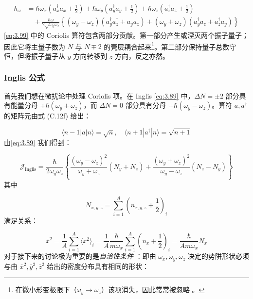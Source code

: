 \begin{align}
h_{\omega} & =\hbar\omega_{x}\left(a^{\dagger}_{x}a_{x}+\frac{1}{2}\right)+\hbar\omega_{y}\left(a^{\dagger}_{y}a_{y}+\frac{1}{2}\right)+\hbar\omega_{z}\left(a^{\dagger}_{z}a_{z}+\frac{1}{2}\right)\nonumber \\
 & \quad+\frac{\hbar\omega}{2\sqrt{\omega_{y}\omega_{z}}}\left\{ (\omega_{y}-\omega_{z})\left(a^{\dagger}_{y}a^{\dagger}_{z}+a_{y}a_{z}\right)+(\omega_{y}+\omega_{z})\left(a^{\dagger}_{y}a_{z}+a^{\dagger}_{z}a_{y}\right)\right\} \label{eq:3.99}
\end{align}
\ref{eq:3.99} 中的 Coriolis 算符包含两部分贡献。第一部分产生或湮灭两个振子量子；因此它将主量子数为 $N$
与 $N\mp2$ 的壳层耦合起来\footnote{在微小形变极限下（$\omega_{y}\to\omega_{z}$）该项消失，因此常常被忽略 \cite{ALL76}。}。第二部分保持量子总数守恒，但将振子量子从
$y$ 方向转移到 $z$ 方向，反之亦然。

\subsubsection{Inglis 公式}

首先我们想在微扰论中处理 Coriolis 项。在 Inglis \ref{eq:3.89} 中，$\Delta N=\pm2$
部分具有能量分母 $\pm\hbar(\omega_{y}+\omega_{z})$，而 $\Delta N=0$ 部分具有分母
$\pm\hbar(\omega_{y}-\omega_{z})$。算符 $a,a^{\dagger}$ 的矩阵元由式 (C.12f)
给出：

\[
\langle n-1|a|n\rangle=\sqrt{n},\quad\langle n+1|a^{\dagger}|n\rangle=\sqrt{n+1}
\]
由\ref{eq:3.89} 我们得到：

\begin{equation}
\mathcal{J}_{\text{Inglis}}=\frac{\hbar}{2\omega_{y}\omega_{z}}\left\{ \frac{(\omega_{y}-\omega_{z})^{2}}{\omega_{y}+\omega_{z}}(N_{y}+N_{z})+\frac{(\omega_{y}+\omega_{z})^{2}}{\omega_{y}-\omega_{z}}(N_{z}-N_{y})\right\} \label{eq:3.100}
\end{equation}
其中

\begin{equation}
N_{x,y,z}=\sum^{A}_{i=1}\left(n_{x,y,z}+\frac{1}{2}\right)_{i}\label{eq:3.101}
\end{equation}
满足关系：

\begin{equation}
\bar{x}^{2}=\frac{1}{A}\sum^{A}_{i=1}\langle x^{2}\rangle_{i}=\frac{1}{A}\frac{\hbar}{m\omega_{x}}\sum^{A}_{i=1}\left(n_{x}+\frac{1}{2}\right)_{i}=\frac{\hbar}{Am\omega_{x}}N_{x}\label{eq:3.102}
\end{equation}
对于接下来的讨论极为重要的是\emph{自洽性条件} \cite{BM75}：即由 $\omega_{x},\omega_{y},\omega_{z}$
决定的势阱形状必须与由 $\bar{x}^{2},\bar{y}^{2},\bar{z}^{2}$ 给出的密度分布具有相同的形状：

